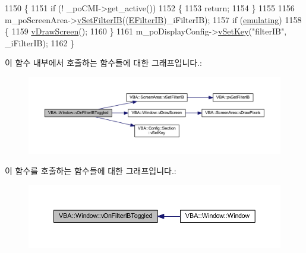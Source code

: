 \begin{DoxyCode}
1150 \{
1151   \textcolor{keywordflow}{if} (! \_poCMI->get\_active())
1152   \{
1153     \textcolor{keywordflow}{return};
1154   \}
1155 
1156   m\_poScreenArea->\mbox{\hyperlink{class_v_b_a_1_1_screen_area_a7a23a673843050e232e83588cfab81ce}{vSetFilterIB}}((\mbox{\hyperlink{class_v_b_a_a304ffeb9f4a8b26e7fa4e2eb620d780f}{EFilterIB}})\_iFilterIB);
1157   \textcolor{keywordflow}{if} (\mbox{\hyperlink{gb_globals_8h_af9cc36078b1b311753963297ae7f2a74}{emulating}})
1158   \{
1159     \mbox{\hyperlink{class_v_b_a_1_1_window_af82e47600303a15b2aa4fdffb90df394}{vDrawScreen}}();
1160   \}
1161   m\_poDisplayConfig->\mbox{\hyperlink{class_v_b_a_1_1_config_1_1_section_a57e1b95cbea40db71c093381beff4b0e}{vSetKey}}(\textcolor{stringliteral}{"filterIB"}, \_iFilterIB);
1162 \}
\end{DoxyCode}
이 함수 내부에서 호출하는 함수들에 대한 그래프입니다.\+:
\nopagebreak
\begin{figure}[H]
\begin{center}
\leavevmode
\includegraphics[width=350pt]{class_v_b_a_1_1_window_afddc93921e9561601104184bb16941e5_cgraph}
\end{center}
\end{figure}
이 함수를 호출하는 함수들에 대한 그래프입니다.\+:
\nopagebreak
\begin{figure}[H]
\begin{center}
\leavevmode
\includegraphics[width=350pt]{class_v_b_a_1_1_window_afddc93921e9561601104184bb16941e5_icgraph}
\end{center}
\end{figure}
\mbox{\label{class_v_b_a_1_1_window_a592d046d6e85921562d26285387cc45a}} 
